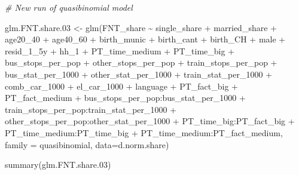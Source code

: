 \documentclass[
]{article}
\newenvironment{Shaded}{\begin{snugshade}}{\end{snugshade}}
\newcommand{\AttributeTok}[1]{\textcolor[rgb]{0.77,0.63,0.00}{#1}}
\newcommand{\CommentTok}[1]{\textcolor[rgb]{0.56,0.35,0.01}{\textit{#1}}}
\newcommand{\FloatTok}[1]{\textcolor[rgb]{0.00,0.00,0.81}{#1}}
\newcommand{\FunctionTok}[1]{\textcolor[rgb]{0.00,0.00,0.00}{#1}}
\newcommand{\NormalTok}[1]{#1}
\newcommand{\OtherTok}[1]{\textcolor[rgb]{0.56,0.35,0.01}{#1}}
\newcommand{\SpecialCharTok}[1]{\textcolor[rgb]{0.00,0.00,0.00}{#1}}
\begin{document}
\begin{Shaded}
\begin{Highlighting}[]
\CommentTok{\# New run of quasibinomial model}

\NormalTok{glm.FNT.share}\FloatTok{.03} \OtherTok{\textless{}{-}} \FunctionTok{glm}\NormalTok{(FNT\_share }\SpecialCharTok{\textasciitilde{}}\NormalTok{ single\_share }\SpecialCharTok{+}\NormalTok{ married\_share }\SpecialCharTok{+} 
\NormalTok{                          age20\_40 }\SpecialCharTok{+}\NormalTok{ age40\_60 }\SpecialCharTok{+}\NormalTok{ birth\_munic }\SpecialCharTok{+}\NormalTok{ birth\_cant }\SpecialCharTok{+} 
\NormalTok{                          birth\_CH }\SpecialCharTok{+}\NormalTok{ male }\SpecialCharTok{+}\NormalTok{ resid\_1\_5y }\SpecialCharTok{+}\NormalTok{ hh\_1 }\SpecialCharTok{+}\NormalTok{ PT\_time\_medium }\SpecialCharTok{+} 
\NormalTok{                          PT\_time\_big }\SpecialCharTok{+}\NormalTok{ bus\_stops\_per\_pop }\SpecialCharTok{+}\NormalTok{ other\_stops\_per\_pop }\SpecialCharTok{+} 
\NormalTok{                          train\_stops\_per\_pop }\SpecialCharTok{+}\NormalTok{ bus\_stat\_per\_1000 }\SpecialCharTok{+} 
\NormalTok{                          other\_stat\_per\_1000 }\SpecialCharTok{+}\NormalTok{ train\_stat\_per\_1000 }\SpecialCharTok{+} 
\NormalTok{                          comb\_car\_1000 }\SpecialCharTok{+}\NormalTok{ el\_car\_1000 }\SpecialCharTok{+}\NormalTok{ language }\SpecialCharTok{+}\NormalTok{ PT\_fact\_big }\SpecialCharTok{+} 
\NormalTok{                          PT\_fact\_medium }\SpecialCharTok{+}\NormalTok{ bus\_stops\_per\_pop}\SpecialCharTok{:}\NormalTok{bus\_stat\_per\_1000 }\SpecialCharTok{+} 
\NormalTok{                          train\_stops\_per\_pop}\SpecialCharTok{:}\NormalTok{train\_stat\_per\_1000 }\SpecialCharTok{+} 
\NormalTok{                          other\_stops\_per\_pop}\SpecialCharTok{:}\NormalTok{other\_stat\_per\_1000 }\SpecialCharTok{+} 
\NormalTok{                          PT\_time\_big}\SpecialCharTok{:}\NormalTok{PT\_fact\_big }\SpecialCharTok{+}\NormalTok{ PT\_time\_medium}\SpecialCharTok{:}\NormalTok{PT\_time\_big }\SpecialCharTok{+} 
\NormalTok{                          PT\_time\_medium}\SpecialCharTok{:}\NormalTok{PT\_fact\_medium, }
                \AttributeTok{family =}\NormalTok{ quasibinomial, }\AttributeTok{data=}\NormalTok{d.norm.share)}

\FunctionTok{summary}\NormalTok{(glm.FNT.share}\FloatTok{.03}\NormalTok{)}
\end{Highlighting}
\end{Shaded}
\end{document}
